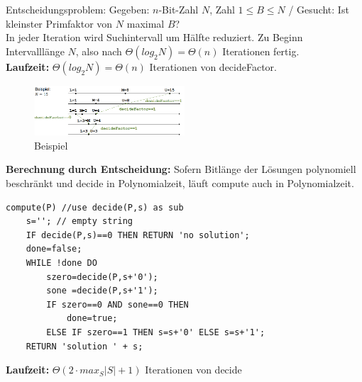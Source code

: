 \documentclass{article}
\begin{document}
            Entscheidungsproblem: Gegeben: $n$-Bit-Zahl $N$, Zahl $1 \leq B \leq N$ / Gesucht: Ist kleinster Primfaktor von $N$ maximal $B$?\\
            In jeder Iteration wird Suchintervall um Hälfte reduziert. Zu Beginn Intervalllänge $N$, also nach $\Theta (log_2N)=\Theta(n)$ Iterationen fertig.\\
            \textbf{Laufzeit:} $\Theta(log_2N)=\Theta(n)$ Iterationen von decideFactor.\\
            \begin{figure}[ht]
                \centering
                \includegraphics[width=0.5\textwidth]{Bilder/FaktorisierenBsp.png}
                \caption{Beispiel}
                \label{fig:FaktorisierenBsp}
            \end{figure}
            \textbf{Berechnung durch Entscheidung:} Sofern Bitlänge der Lösungen polynomiell beschränkt und decide in Polynomialzeit, läuft compute auch in Polynomialzeit.\\
            \begin{lstlisting}[style=pseudocode]
compute(P) //use decide(P,s) as sub
    s=''; // empty string
    IF decide(P,s)==0 THEN RETURN 'no solution';
    done=false;
    WHILE !done DO
        szero=decide(P,s+'0');
        sone =decide(P,s+'1');
        IF szero==0 AND sone==0 THEN
            done=true;
        ELSE IF szero==1 THEN s=s+'0' ELSE s=s+'1';
    RETURN 'solution ' + s;
            \end{lstlisting}
            \textbf{Laufzeit:} $\Theta(2\cdot max_S|S|+1)$ Iterationen von decide
\end{document}
